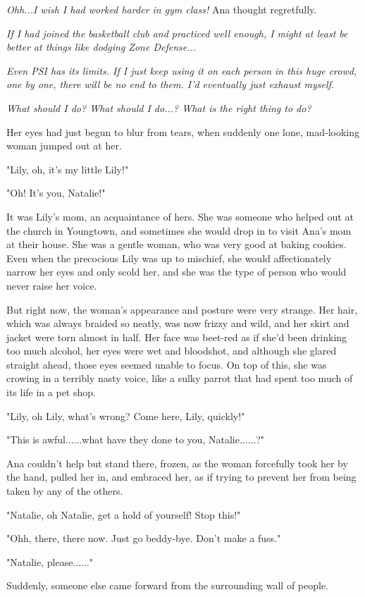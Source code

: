\documentclass[
]{article}
\begin{document}
\emph{Ohh...I wish I had worked harder in gym class!} Ana thought
regretfully.

\emph{If I had joined the basketball club and practiced well enough, I
might at least be better at things like dodging Zone Defense...}

\emph{Even PSI has its limits. If I just keep using it on each person in
this huge crowd, one by one, there will be no end to them. I'd
eventually just exhaust myself.}

\emph{What should I do? What should I do...? What is the right thing to
do?}

Her eyes had just begun to blur from tears, when suddenly one lone,
mad-looking woman jumped out at her.

"Lily, oh, it's my little Lily!"

"Oh! It's you, Natalie!"

It was Lily's mom, an acquaintance of hers. She was someone who helped
out at the church in Youngtown, and sometimes she would drop in to visit
Ana's mom at their house. She was a gentle woman, who was very good at
baking cookies. Even when the precocious Lily was up to mischief, she
would affectionately narrow her eyes and only scold her, and she was the
type of person who would never raise her voice.

But right now, the woman's appearance and posture were very strange. Her
hair, which was always braided so neatly, was now frizzy and wild, and
her skirt and jacket were torn almost in half. Her face was beet-red as
if she'd been drinking too much alcohol, her eyes were wet and
bloodshot, and although she glared straight ahead, those eyes seemed
unable to focus. On top of this, she was crowing in a terribly nasty
voice, like a sulky parrot that had spent too much of its life in a pet
shop.

"Lily, oh Lily, what's wrong? Come here, Lily, quickly!"

"This is awful......what have they done to you, Natalie......?"

Ana couldn't help but stand there, frozen, as the woman forcefully took
her by the hand, pulled her in, and embraced her, as if trying to
prevent her from being taken by any of the others.

"Natalie, oh Natalie, get a hold of yourself! Stop this!"

"Ohh, there, there now. Just go beddy-bye. Don't make a fuss."

"Natalie, please......"

Suddenly, someone else came forward from the surrounding wall of people.
\end{document}
